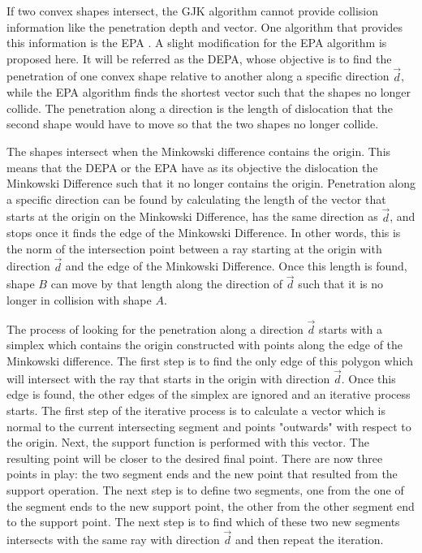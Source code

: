 \par If two convex shapes intersect, the \ac{GJK} algorithm cannot provide collision information like the penetration depth and vector. One algorithm that provides this information is the \ac{EPA} \cite{van2001proximity}.
A slight modification for the \ac{EPA} algorithm is proposed here. It will be referred as the \acl{DEPA}, whose objective is to find the penetration of one convex shape relative to another along a specific direction $\overrightarrow{d}$, while the \ac{EPA} algorithm finds the shortest vector such that the shapes no longer collide. The penetration along a direction is the length of dislocation that the second shape would have to move so that the two shapes no longer collide. 
\par The shapes intersect when the Minkowski difference contains the origin. This means that the \ac{DEPA} or the \ac{EPA} have as its objective the dislocation the Minkowski Difference such that it no longer contains the origin. Penetration along a specific direction can be found by calculating the length of the vector that starts at the origin on the Minkowski Difference, has the same direction as $\overrightarrow{d}$, and stops once it finds the edge of the Minkowski Difference. In other words, this is the norm of the intersection point between a ray starting at the origin with direction $\overrightarrow{d}$ and the edge of the Minkowski Difference. Once this length is found, shape $B$ can move by that length along the direction of $\overrightarrow{d}$ such that it is no longer in collision with shape $A$.
\par The process of looking for the penetration along a direction $\overrightarrow{d}$ starts with a simplex which contains the origin constructed with points along the edge of the Minkowski difference. The first step is to find the only edge of this polygon which will intersect with the ray that starts in the origin with direction $\overrightarrow{d}$. Once this edge is found, the other edges of the simplex are ignored and an iterative process starts. The first step of the iterative process is to calculate a vector which is normal to the current intersecting segment and points "outwards" with respect to the origin. Next, the support function is performed with this vector. The resulting point will be closer to the desired final point. There are now three points in play: the two segment ends and the new point that resulted from the support operation. The next step is to define two segments, one from the one of the segment ends to the new support point, the other from the other segment end to the support point. The next step is to find which of these two new segments intersects with the same ray with direction $\overrightarrow{d}$ and then repeat the iteration. 




